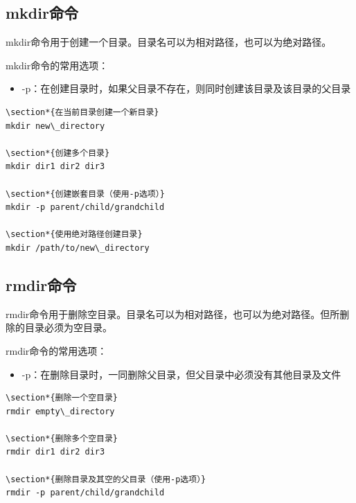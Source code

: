 \documentclass[12pt,UTF8]{ctexbook}
\begin{document}
\subsection{mkdir命令}
mkdir命令用于创建一个目录。目录名可以为相对路径，也可以为绝对路径。

mkdir命令的常用选项：
\begin{itemize}
    \item -p：在创建目录时，如果父目录不存在，则同时创建该目录及该目录的父目录
\end{itemize}

\begin{verbatim}
\section*{在当前目录创建一个新目录}
mkdir new\_directory

\section*{创建多个目录}
mkdir dir1 dir2 dir3

\section*{创建嵌套目录（使用-p选项）}
mkdir -p parent/child/grandchild

\section*{使用绝对路径创建目录}
mkdir /path/to/new\_directory
\end{verbatim}

\subsection{rmdir命令}
rmdir命令用于删除空目录。目录名可以为相对路径，也可以为绝对路径。但所删除的目录必须为空目录。

rmdir命令的常用选项：
\begin{itemize}
    \item -p：在删除目录时，一同删除父目录，但父目录中必须没有其他目录及文件
\end{itemize}

\begin{verbatim}
\section*{删除一个空目录}
rmdir empty\_directory

\section*{删除多个空目录}
rmdir dir1 dir2 dir3

\section*{删除目录及其空的父目录（使用-p选项）}
rmdir -p parent/child/grandchild
\end{verbatim}
\end{document}
